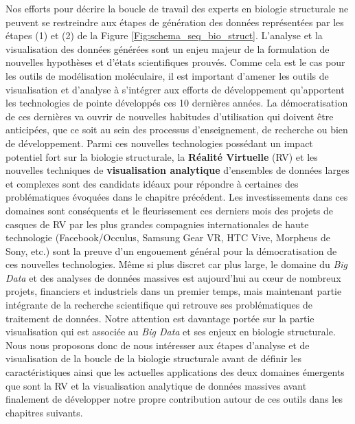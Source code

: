 Nos efforts pour décrire la boucle de travail des experts en biologie structurale ne peuvent se restreindre aux étapes de génération des données représentées par les étapes (1) et (2) de la Figure \ref{Fig:schema_seq_bio_struct}. L'analyse et la visualisation des données générées sont un enjeu majeur de la formulation de nouvelles hypothèses et d'états scientifiques prouvés. Comme cela est le cas pour les outils de modélisation moléculaire, il est important d'amener les outils de visualisation et d'analyse à s'intégrer aux efforts de développement qu'apportent les technologies de pointe développés ces 10 dernières années. La démocratisation de ces dernières va ouvrir de nouvelles habitudes d'utilisation qui doivent être anticipées, que ce soit au sein des processus d'enseignement, de recherche ou bien de développement. Parmi ces nouvelles technologies possédant un impact potentiel fort sur la biologie structurale, la \textbf{Réalité Virtuelle} (RV) et les nouvelles techniques de \textbf{visualisation analytique} d'ensembles de données larges et complexes sont des candidats idéaux pour répondre à certaines des problématiques évoquées dans le chapitre précédent. Les investissements dans ces domaines sont conséquents et le fleurissement ces derniers mois des projets de casques de RV par les plus grandes compagnies internationales de haute technologie (Facebook/Occulus, Samsung Gear VR, HTC Vive, Morpheus de Sony, etc.) sont la preuve d'un engouement général pour la démocratisation de ces nouvelles technologies. Même si plus discret car plus large, le domaine du \textit{Big Data} et des analyses de données massives est aujourd'hui au cœur de nombreux projets, financiers et industriels dans un premier temps, mais maintenant partie intégrante de la recherche scientifique qui retrouve ses problématiques de traitement de données. Notre attention est davantage portée sur la partie visualisation qui est associée au \textit{Big Data} et ses enjeux en biologie structurale. Nous nous proposons donc de nous intéresser aux étapes d'analyse et de visualisation de la boucle de la biologie structurale avant de définir les caractéristiques ainsi que les actuelles applications des deux domaines émergents que sont la RV et la visualisation analytique de données massives avant finalement de développer notre propre contribution autour de ces outils dans les chapitres suivants.

